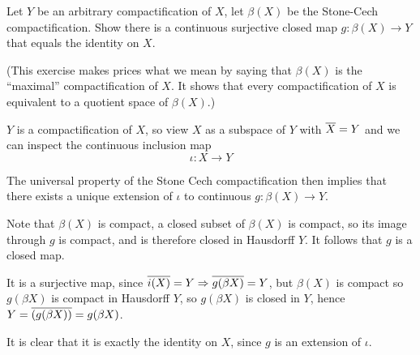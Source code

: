 \documentclass[a4paper, 10pt]{article}
\begin{document}
\begin{problem} [38.4]
    Let $Y$ be an arbitrary compactification of $X$, let $\beta(X)$ be the Stone-Cech compactification. Show there is a continuous surjective closed map $g: \beta(X) \to Y$ that equals the identity on $X$.

    (This exercise makes prices what we mean by saying that $\beta(X)$ is the ``maximal'' compactification of $X$. It shows that every compactification of $X$ is equivalent to a quotient space of $\beta(X)$.)
\end{problem}
\begin{solution}
    $Y$ is a compactification of $X$, so view $X$ as a subspace of $Y$ with $\overline{X} = Y$ and we can inspect the continuous inclusion map \begin{equation*}
        \iota: X \to Y
    \end{equation*}

    The universal property of the Stone Cech compactification then implies that there exists a unique extension of $\iota$ to continuous $g: \beta(X) \to Y$.

    Note that $\beta(X)$ is compact, a closed subset of $\beta(X)$ is compact, so its image through $g$ is compact, and is therefore closed in Hausdorff $Y$. It follows that $g$ is a closed map.

    It is a surjective map, since $\overline{i(X)} = Y \Rightarrow \overline{g(\beta X)} = Y$, but $\beta(X)$ is compact so $g(\beta X)$ is compact in Hausdorff $Y$, so $g(\beta X)$ is closed in $Y$, hence $Y = \overline{(g(\beta X))} = g(\beta X)$.

    It is clear that it is exactly the identity on $X$, since $g$ is an extension of $\iota$.
\end{solution}
\end{document}
